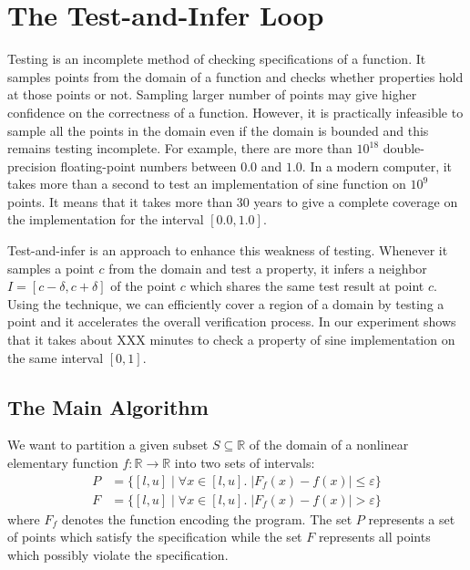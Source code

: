 \section{The Test-and-Infer Loop}

Testing is an incomplete method of checking specifications of a
function. It samples points from the domain of a function and checks
whether properties hold at those points or not. Sampling larger number
of points may give higher confidence on the correctness of a function.
However, it is practically infeasible to sample all the points in the
domain even if the domain is bounded and this remains testing
incomplete. For example, there are more than $10^{18}$ double-precision
floating-point numbers between $0.0$ and $1.0$. In a modern computer,
it takes more than a second to test an implementation of sine function
on $10^9$ points. It means that it takes more than 30 years to give a
complete coverage on the implementation for the interval $[0.0, 1.0]$.

Test-and-infer is an approach to enhance this weakness of testing.
Whenever it samples a point $c$ from the domain and test a property,
it infers a neighbor $I = [c - \delta, c + \delta]$ of the point $c$
which shares the same test result at point $c$. Using the technique,
we can efficiently cover a region of a domain by testing a point and
it accelerates the overall verification process. In our experiment
shows that it takes about XXX minutes to check a property of sine
implementation on the same interval $[0, 1]$.

\subsection{The Main Algorithm}
We want to partition a given subset $S \subseteq \mathbb{R}$ of the
domain of a nonlinear elementary function $f : \mathbb{R} \to
\mathbb{R}$ into two sets of intervals:
\begin{align*}
  P & = \{ [l, u] \mid \forall x \in [l, u]. \; | F_f(x) - f(x) | \le \varepsilon \}\\
  F & = \{ [l, u] \mid \forall x \in [l, u]. \; | F_f(x) - f(x) | > \varepsilon \}
\end{align*}
where $F_f$ denotes the function encoding the program. The set $P$
represents a set of points which satisfy the specification while the
set $F$ represents all points which possibly violate the
specification.

